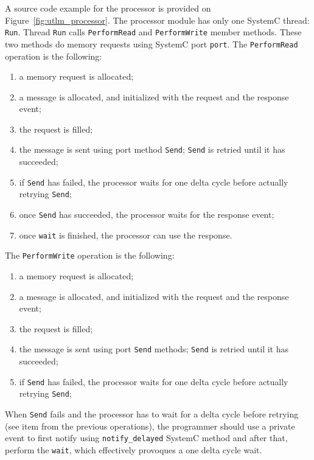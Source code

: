A source code example for the processor is provided on
Figure~\ref{fig:utlm_processor}. The processor module has only one
SystemC thread: \texttt{Run}. Thread \texttt{Run} calls
\texttt{PerformRead} and \texttt{PerformWrite} member methods. These
two methods do memory requests using SystemC port \texttt{port}. The
\texttt{PerformRead} operation is the following:

\begin{enumerate}
\item[{\large \ding{202}}] a memory request is allocated;
\item[{\large \ding{203}}] a message is allocated, and initialized
  with the request and the response event;
\item[{\large \ding{204}}] the request is filled;
\item[{\large \ding{205}}] the message is sent using port method
  \texttt{Send}; \texttt{Send} is retried until it has
  succeeded;
\item[{\large \ding{206}}] if \texttt{Send} has failed, the processor
  waits for one delta cycle before actually retrying \texttt{Send};
\item[{\large \ding{207}}] once \texttt{Send} has succeeded, the
  processor waits for the response event;
\item[{\large \ding{208}}] once \texttt{wait} is finished, the
  processor can use the response.
\end{enumerate}

The \texttt{PerformWrite} operation is the following:
\begin{enumerate}
\item[{\large \ding{202}}] a memory request is allocated;
\item[{\large \ding{203}}] a message is allocated, and initialized
  with the request and the response event;
\item[{\large \ding{204}}] the request is filled;
\item[{\large \ding{205}}] the message is sent using port
  \texttt{Send} methods; \texttt{Send} is retried until it has
  succeeded;
\item[{\large \ding{206}}] if \texttt{Send} has failed, the processor
  waits for one delta cycle before actually retrying \texttt{Send};
\end{enumerate}

When \texttt{Send} fails and the processor has to wait for a delta
cycle before retrying (see item {\large {}} from the previous
operations), the programmer should use a private event to first notify
using \texttt{notify\_delayed} SystemC method and after that, perform
the \texttt{wait}, which effectively provoques a one delta cycle wait.

